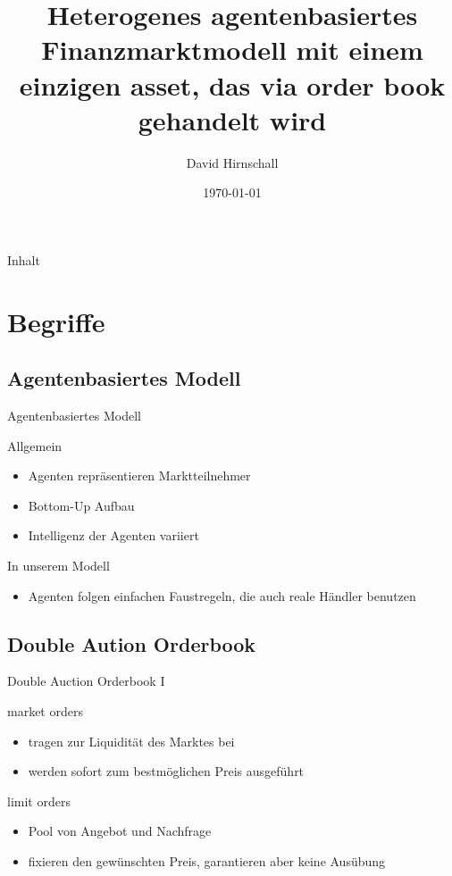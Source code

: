\documentclass{beamer}
\title{Heterogenes agentenbasiertes Finanzmarktmodell mit einem einzigen asset, das via order book gehandelt wird}
\author{David Hirnschall}
\date{\today}
\begin{document}
	\maketitle
	\begin{frame}{Inhalt}
		\tableofcontents	
	\end{frame}
	
\section{Begriffe}
\subsection{Agentenbasiertes Modell}
	\begin{frame}{Agentenbasiertes Modell}
		\begin{block}{Allgemein}
			\begin{itemize}
				\item Agenten repräsentieren Marktteilnehmer
				\item Bottom-Up Aufbau	
				\item Intelligenz der Agenten variiert
			\end{itemize}
		\end{block}
		\begin{block}{In unserem Modell}
			\begin{itemize}
				\item Agenten folgen einfachen Faustregeln, die auch reale Händler benutzen
			\end{itemize}	
		\end{block}
	\end{frame}
\subsection{Double Aution Orderbook}
	\begin{frame}{Double Auction Orderbook I}
		\begin{block}{market orders}	
			\begin{itemize}
				\item tragen zur Liquidität des Marktes bei
				\item werden sofort zum bestmöglichen Preis ausgeführt
			\end{itemize}
		\end{block}
		\begin{block}{limit orders}
			\begin{itemize}
				\item Pool von Angebot und Nachfrage
				\item fixieren den gewünschten Preis, garantieren aber keine Ausübung
			\end{itemize}
		\end{block}
	\end{frame}
\end{document}
